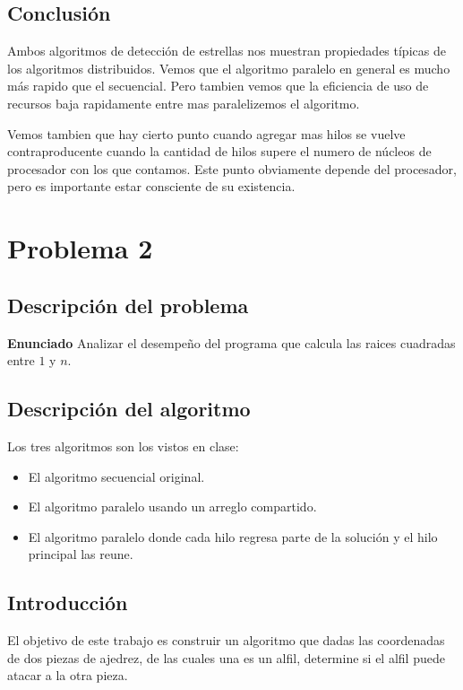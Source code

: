 \documentclass{report}
\begin{document}
\section{Conclusión}

Ambos algoritmos de detección de estrellas nos muestran propiedades típicas de los
algoritmos distribuidos. Vemos que el algoritmo paralelo en general es mucho más
rapido que el secuencial. Pero tambien vemos que la eficiencia de uso de recursos
baja rapidamente entre mas paralelizemos el algoritmo.

Vemos tambien que hay cierto punto cuando agregar mas hilos se vuelve
contraproducente cuando la cantidad de hilos supere el numero de núcleos de
procesador con los que contamos. Este punto obviamente depende del procesador, pero
es importante estar consciente de su existencia.

\chapter{Problema 2}

\section{Descripción del problema}

\textbf{Enunciado} Analizar el desempeño del programa que calcula las raices
cuadradas entre $1$ y $n$.

\section{Descripción del algoritmo}

Los tres algoritmos son los vistos en clase:

\begin{itemize}
  \item El algoritmo secuencial original.
  \item El algoritmo paralelo usando un arreglo compartido.
  \item El algoritmo paralelo donde cada hilo regresa parte de la solución y el
    hilo principal las reune.
\end{itemize}

%
\section{Introducci\'on}
El objetivo de este trabajo es construir un algoritmo que dadas las coordenadas de dos piezas de ajedrez, de las 
cuales una es un alfil, determine si el alfil puede atacar a la otra pieza.
%
\end{document}
